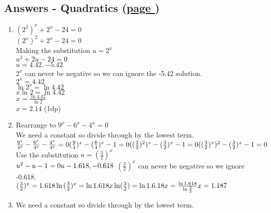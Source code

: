 \documentclass[../main.tex]{subfiles}
\begin{document}
\hypertarget{quadraticsanswers}{\subsection*{Answers - Quadratics (\hyperlink{quadraticslink}{page \pageref{quadratics}})}}

\label{Quadratics answers}
\begin{spacing}{1.5}
\begin{enumerate}
    \item
    \((2^2)^x+2^x-24=0\)\\
    \((2^x)^2+2^x-24=0\)\\
    Making the substitution \(u=2^x\)\\
    \(u^2+2u-24=0\)\\
    \(u=4.42, -5.42\)\\
    \(2^x\) can never be negative so we can ignore the -5.42 solution.\\
    \(2^x=4.42\)\\
    \(\ln{2^x}=\ln{4.42}\)\\
    \(x\ln{2}=\ln{4.42}\)\\
    \(x=\frac{\ln{4.42}}{\ln{2}}\)\\
    \(x=2.14\) (1dp)
    \item 
    Rearrange to \(9^x-6^x-4^x=0\)\\
    We need a constant so divide through by the lowest term.\\
    \(
    \frac{9^x}{4^x}-\frac{6^x}{4^x}-\frac{4^x}{4^x}=0\\
    (\frac{9}{4})^x-(\frac{6}{4})^x-1=0\\
    ((\frac{3}{2})^2)^x-(\frac{3}{2})^x-1=0\\
    ((\frac{3}{2})^x)^2-(\frac{3}{2})^x-1=0\\ 
    \)
    Use the substitution \(u=(\frac{3}{2})^x\)\\
    \(
    u^2-u-1=0\\
    u-1.618, -0.618\\
    \)
    \((\frac{3}{2})^x\) can never be negative so we ignore -0.618.\\
    \(
    (\frac{3}{2})^x=1.618\\
    \ln{(\frac{3}{2})^x}=\ln{1.618}\\
    x\ln(\frac{3}{2})=\ln{1.6.18}\\
    x=\frac{\ln{1.618}}{\ln{\frac{3}{2}}}\\
    x=1.187
    \)
    \item 
    We need a constant so divide through by the lowest term.\\

\end{enumerate}
\end{spacing}
\end{document}
